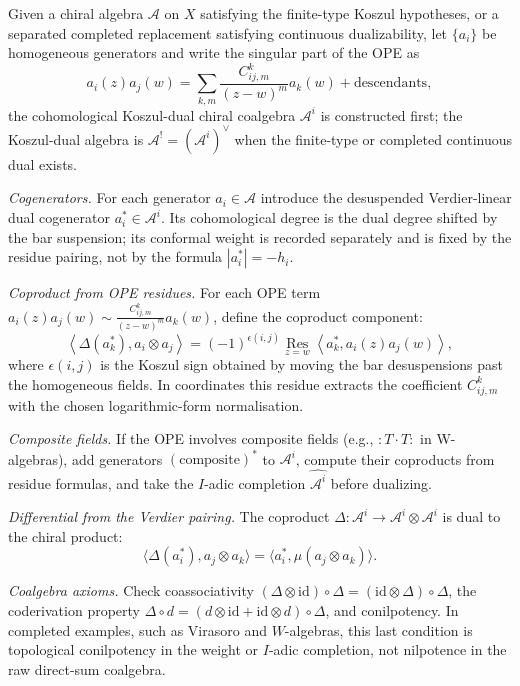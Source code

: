 Given a chiral algebra $\mathcal{A}$ on $X$ satisfying the finite-type
Koszul hypotheses, or a separated completed replacement satisfying
continuous dualizability, let $\{a_i\}$ be homogeneous generators and
write the singular part of the OPE as
\[
a_i(z) a_j(w) = \sum_{k,m}\frac{C^k_{ij,m}}{(z-w)^m}a_k(w) + \text{descendants},
\]
the cohomological Koszul-dual chiral coalgebra $\mathcal{A}^i$
is constructed first; the Koszul-dual algebra is
$\mathcal{A}^!=(\mathcal{A}^i)^\vee$ when the finite-type or
completed continuous dual exists.

\emph{Cogenerators.}
For each generator $a_i \in \mathcal{A}$ introduce the desuspended
Verdier-linear dual cogenerator $a_i^*\in \mathcal{A}^i$. Its
cohomological degree is the dual degree shifted by the bar suspension;
its conformal weight is recorded separately and is fixed by the
residue pairing, not by the formula $|a_i^*|=-h_i$.

\emph{Coproduct from OPE residues.}
For each OPE term $a_i(z)a_j(w) \sim \frac{C^k_{ij,m}}{(z-w)^m} a_k(w)$, define the coproduct component:
\[
\left\langle \Delta(a_k^*),a_i\otimes a_j\right\rangle
=
(-1)^{\epsilon(i,j)}
\operatorname*{Res}_{z=w}
\left\langle a_k^*,a_i(z)a_j(w)\right\rangle ,
\]
where $\epsilon(i,j)$ is the Koszul sign obtained by moving the bar
desuspensions past the homogeneous fields. In coordinates this residue
extracts the coefficient $C^k_{ij,m}$ with the chosen logarithmic-form
normalisation.

\emph{Composite fields.}
If the OPE involves composite fields (e.g., $:T \cdot T:$ in W-algebras),
add generators $(\text{composite})^*$ to $\mathcal{A}^i$,
compute their coproducts from residue formulas,
and take the $I$-adic completion $\widehat{\mathcal{A}^i}$ before
dualizing.

\emph{Differential from the Verdier pairing.}
The coproduct
$\Delta\colon \mathcal{A}^i \to \mathcal{A}^i \otimes \mathcal{A}^i$ is
dual to the chiral product:
\[
\langle \Delta(a_i^*), a_j \otimes a_k \rangle = \langle a_i^*, \mu(a_j \otimes a_k)\rangle.
\]

\emph{Coalgebra axioms.}
Check coassociativity $(\Delta \otimes \mathrm{id}) \circ \Delta = (\mathrm{id} \otimes \Delta) \circ \Delta$,
the coderivation property $\Delta \circ d = (d \otimes \mathrm{id} + \mathrm{id} \otimes d) \circ \Delta$,
and conilpotency. In completed examples, such as Virasoro and
$W$-algebras, this last condition is topological conilpotency in the
weight or $I$-adic completion, not nilpotence in the raw direct-sum
coalgebra.

